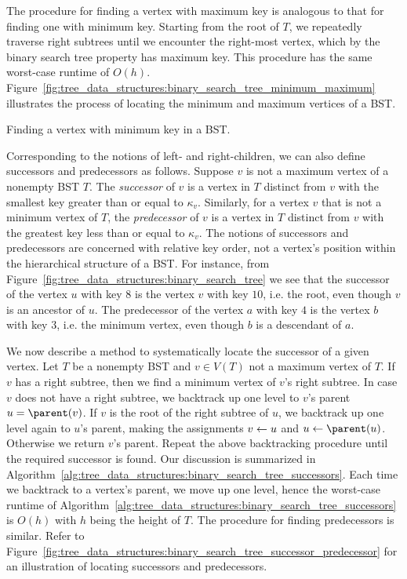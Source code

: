 The procedure for finding a vertex with maximum key is analogous to
that for finding one with minimum key. Starting from the root of $T$,
we repeatedly traverse right subtrees until we encounter the
right-most vertex, which by the binary search tree property has
maximum key. This procedure has the same worst-case runtime of $O(h)$.
Figure~\ref{fig:tree_data_structures:binary_search_tree_minimum_maximum}
illustrates the process of locating the minimum and maximum vertices
of a BST.

\begin{algorithm}[!htbp]

\caption{Finding a vertex with minimum key in a BST.}
\label{alg:tree_data_structures:binary_search_tree_minimum_key}
\end{algorithm}

Corresponding to the notions of left- and right-children, we can also
define successors and predecessors as follows. Suppose $v$ is not a
maximum vertex of a nonempty BST $T$. The \emph{successor} of $v$ is a
vertex in $T$ distinct from $v$ with the smallest key greater than or
equal to $\kappa_v$. Similarly, for a vertex $v$ that is not a minimum
vertex of $T$, the \emph{predecessor} of $v$ is a vertex in $T$
distinct from $v$ with the greatest key less than or equal to
$\kappa_v$. The notions of successors and predecessors are concerned
with relative key order, not a vertex's position within the
hierarchical structure of a BST. For instance, from
Figure~\ref{fig:tree_data_structures:binary_search_tree} we see that
the successor of the vertex $u$ with key $8$ is the vertex $v$ with
key $10$, i.e. the root, even though $v$ is an ancestor of $u$. The
predecessor of the vertex $a$ with key $4$ is the vertex $b$ with key
$3$, i.e. the minimum vertex, even though $b$ is a descendant of $a$.

We now describe a method to systematically locate the successor of a
given vertex. Let $T$ be a nonempty BST and $v \in V(T)$ not a maximum
vertex of $T$. If $v$ has a right subtree, then we find a minimum
vertex of $v$'s right subtree. In case $v$ does not have a right
subtree, we backtrack up one level to $v$'s parent
$u = \parent(v)$. If $v$ is the root of the right subtree of $u$, we
backtrack up one level again to $u$'s parent, making the assignments
$v \leftarrow u$ and $u \assign \parent(u)$. Otherwise we return $v$'s
parent. Repeat the above backtracking procedure until the required
successor is found. Our discussion is summarized in
Algorithm~\ref{alg:tree_data_structures:binary_search_tree_successors}.
Each time we backtrack to a vertex's parent, we move up one
level, hence the worst-case runtime of
Algorithm~\ref{alg:tree_data_structures:binary_search_tree_successors}
is $O(h)$ with $h$ being the height of $T$. The procedure for finding
predecessors is similar. Refer to
Figure~\ref{fig:tree_data_structures:binary_search_tree_successor_predecessor}
for an illustration of locating successors and predecessors.

